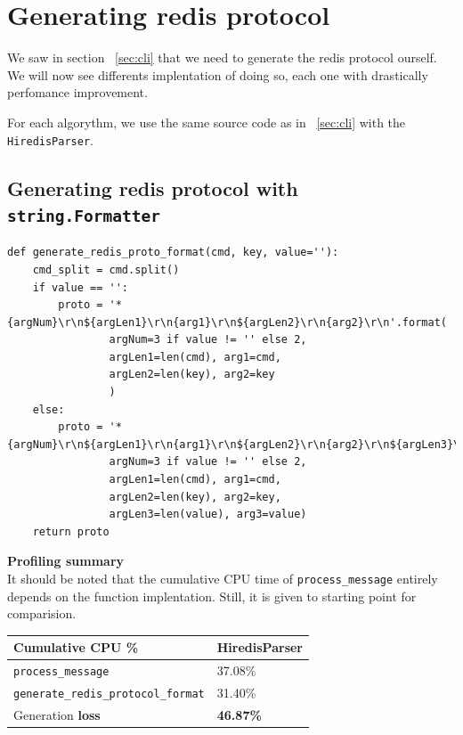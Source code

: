 \documentclass[a4paper, 11pt]{report}
\begin{document}
\newpage
\section{Generating redis protocol\label{sec:proto}}
We saw in section ~\ref{sec:cli} that we need to generate the redis protocol ourself. We will now see differents implentation of doing so, each one with drastically perfomance improvement.

For each algorythm, we use the same source code as in ~\ref{sec:cli} with the \texttt{HiredisParser}.

\subsection{Generating redis protocol with \texttt{string.Formatter} \label{sec:proto1}}

\begin{lstlisting}
def generate_redis_proto_format(cmd, key, value=''):
    cmd_split = cmd.split()
    if value == '':
        proto = '*{argNum}\r\n${argLen1}\r\n{arg1}\r\n${argLen2}\r\n{arg2}\r\n'.format(
                argNum=3 if value != '' else 2,
                argLen1=len(cmd), arg1=cmd,
                argLen2=len(key), arg2=key
                )
    else:
        proto = '*{argNum}\r\n${argLen1}\r\n{arg1}\r\n${argLen2}\r\n{arg2}\r\n${argLen3}\r\n{arg3}\r\n'.format(
                argNum=3 if value != '' else 2,
                argLen1=len(cmd), arg1=cmd,
                argLen2=len(key), arg2=key,
                argLen3=len(value), arg3=value)
    return proto
\end{lstlisting}

\textbf{Profiling summary}\\
It should be noted that the cumulative CPU time of \texttt{process\_message} entirely depends on the function implentation. Still, it is given to starting point for comparision.\\

\begin{tabular}{|l|l|}
    \hline
    Cumulative CPU \% & HiredisParser\\
    \hline
    \texttt{process\_message} & 37.08\%\\
    \hline
    \texttt{generate\_redis\_protocol\_format} & 31.40\%\\
    \hline
    Generation \textbf{loss}\footnotemark & \textbf{46.87\%}\\
    \hline
\end{tabular}
\end{document}
